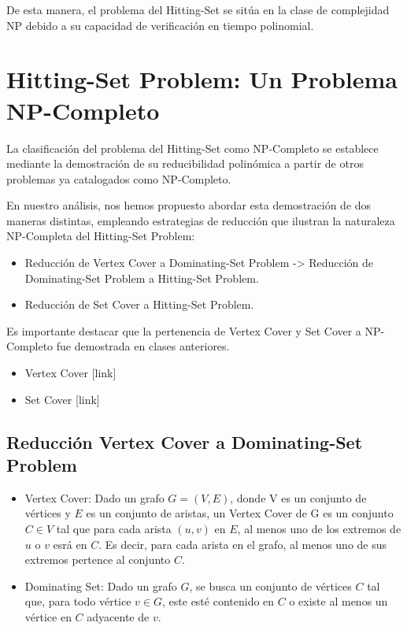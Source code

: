 De esta manera, el problema del Hitting-Set se sitúa en la clase de complejidad NP debido a su capacidad de verificación en tiempo polinomial. 

\section{Hitting-Set Problem: Un Problema NP-Completo}

La clasificación del problema del Hitting-Set como NP-Completo se establece mediante la demostración
de su reducibilidad polinómica a partir de otros problemas ya catalogados como NP-Completo. 

En nuestro análisis, nos hemos propuesto abordar esta demostración de dos maneras distintas, 
empleando estrategias de reducción que ilustran la naturaleza NP-Completa del Hitting-Set Problem:

\begin{itemize}
    \item Reducción de Vertex Cover a Dominating-Set Problem -> Reducción de Dominating-Set Problem a Hitting-Set Problem.
    \item Reducción de Set Cover a Hitting-Set Problem.
\end{itemize}


Es importante destacar que la pertenencia de Vertex Cover y Set Cover a NP-Completo fue demostrada en clases anteriores.
\begin{itemize}
    \item  Vertex Cover [link]
    \item Set Cover [link]
\end{itemize}


\subsection{Reducción Vertex Cover a Dominating-Set Problem}

\begin{itemize}
    \item Vertex Cover: Dado un grafo $G=(V,E)$, donde V es un conjunto de vértices y $E$ es un conjunto de aristas, un Vertex Cover de G es un conjunto $C \in V$ tal que para cada arista $(u,v)$ en $E$, al menos uno de los extremos de $u$ o $v$ esrá en $C$. Es decir, para cada arista en el grafo, al menos uno de sus extremos pertence al conjunto $C$. 
    \item Dominating Set: Dado un grafo $G$, se busca un conjunto de vértices $C$
    tal que, para todo vértice $v \in G$, este esté contenido en $C$ o existe al menos un vértice en $C$ adyacente de $v$.
\end{itemize}


